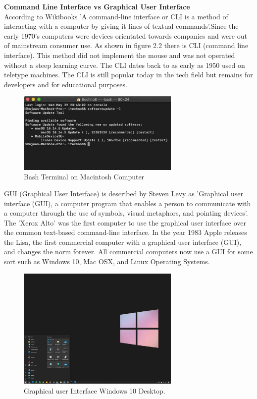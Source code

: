 \textbf{ Command Line Interface vs Graphical User Interface}\\

According to Wikibooks 'A command-line interface or CLI is a method of interacting with a computer by giving it lines of textual commands'.Since the early 1970's computers were devices orientated towards companies and were out of mainstream consumer use. As shown in figure 2.2 there is CLI (command line interface). This method did not implement the mouse and was not operated without a steep learning curve. The CLI dates back to as early as 1950 used on teletype machines. The CLI is still popular today in the tech field but remains for developers and for educational purposes.




\begin{figure}[h!]
  \centering
    \includegraphics[width=0.7\textwidth]{Research-Latex/images/TheBashterminal.jpg}
     \caption{Bash Terminal on Macintosh Computer}
\end{figure}

GUI (Graphical User Interface) is described by Steven Levy as  'Graphical user interface (GUI), a computer program that enables a person to communicate with a computer through the use of symbols, visual metaphors, and pointing devices'. The 'Xerox Alto' was the first computer to use the graphical user interface over the common text-based command-line interface. In the year 1983 Apple releases the Lisa, the first commercial computer with a graphical user interface (GUI), and changes the norm forever. All commercial computers now use a GUI for some sort such as Windows 10, Mac OSX, and Linux Operating Systems. 

\begin{figure}[h!]
  \centering
    \includegraphics[width=0.7\textwidth]{Research-Latex/images/WINDOWS10-DESKTOP.jpg}
     \caption{Graphical user Interface Windows 10 Desktop.}
\end{figure}






